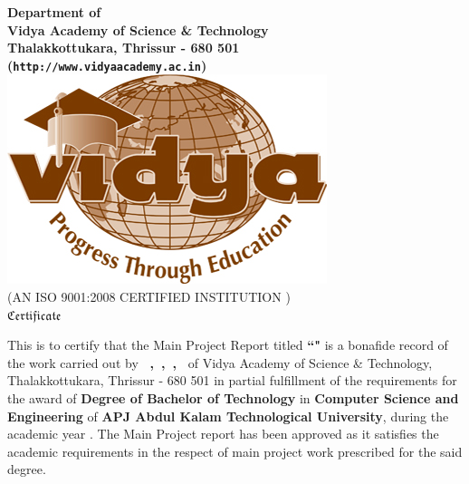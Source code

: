 



\begin{titlepage}


\begin{center}


{\Large \bf Department of \vdept  }\\
{\Large \bf Vidya Academy of Science \& Technology}\\
{\normalsize \bf Thalakkottukara, Thrissur - 680 501\\
({\tt http://www.vidyaacademy.ac.in})}\\[0.75cm]
%
%
\includegraphics[width=3.5 cm]{VidyaLogo.JPG}\\
\scriptsize (AN ISO 9001:2008 CERTIFIED INSTITUTION )\\[.3 cm]
%
 \Huge  $ \mathfrak{Certificate}$\\[0.3cm]
%
\end{center}

\quad This is to certify that the Main Project Report titled {\bf ``\vtitle"} is a bonafide record of the work carried out by {\bf \vauthora\ ,\vauthorb\ ,\vauthorc\ ,\vauthord\ }  of Vidya Academy of Science \& Technology, Thalakkottukara, Thrissur - 680 501 in partial fulfillment of the requirements for the award of  {\bf Degree of Bachelor of Technology} in {\bf Computer Science and Engineering} of  {\bf APJ Abdul Kalam Technological University}, during the academic year \vacademicyear. The Main Project report has been approved as it satisfies the academic requirements in the respect of main project work prescribed for the said degree.\\[.3cm]
 

\end{titlepage}
